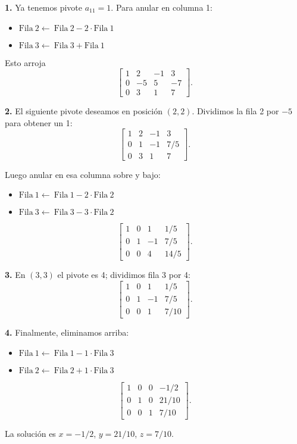 \noindent \textbf{1.} Ya tenemos pivote \(a_{11}=1\). Para anular en columna 1:
\begin{itemize}
  \item \(\text{Fila} ~ 2 \leftarrow ~ \text{Fila} ~ 2 - 2\cdot\text{Fila} ~ 1\)
  \item \(\text{Fila} ~ 3 \leftarrow ~ \text{Fila} ~ 3 + \text{Fila} ~ 1\)
\end{itemize}
Esto arroja
\[
\left[\begin{array}{ccc|c}
1 & 2 & -1 & 3\\
0 & -5 & 5 & -7\\
0 & 3 & 1 & 7
\end{array}\right].
\]

\noindent \textbf{2.} El siguiente pivote deseamos en posición \((2,2)\). Dividimos la fila 2 por \(-5\) para obtener un 1:
\[
\left[\begin{array}{ccc|c}
1 & 2 & -1 & 3\\
0 & 1 & -1 & 7/5\\
0 & 3 & 1 & 7
\end{array}\right].
\]

Luego anular en esa columna sobre y bajo:
\begin{itemize}
  \item \(\text{Fila} ~ 1 \leftarrow ~ \text{Fila} ~ 1 - 2\cdot\text{Fila} ~ 2\)
  \item \(\text{Fila} ~ 3 \leftarrow ~ \text{Fila} ~ 3 - 3\cdot\text{Fila} ~ 2\)
\end{itemize}

\[
\left[\begin{array}{ccc|c}
1 & 0 & 1 & 1/5\\
0 & 1 & -1 & 7/5\\
0 & 0 & 4 & 14/5
\end{array}\right].
\]

\noindent \textbf{3.} En \((3,3)\) el pivote es 4; dividimos fila 3 por 4:
\[
\left[\begin{array}{ccc|c}
1 & 0 & 1 & 1/5\\
0 & 1 & -1 & 7/5\\
0 & 0 & 1 & 7/10
\end{array}\right].
\]

\noindent \textbf{4.} Finalmente, eliminamos arriba:
\begin{itemize}
  \item \(\text{Fila} ~ 1 \leftarrow ~ \text{Fila} ~ 1 - 1\cdot\text{Fila} ~ 3\)
  \item \(\text{Fila} ~ 2 \leftarrow ~ \text{Fila} ~ 2 + 1\cdot\text{Fila} ~ 3\)
\end{itemize}

\[
\left[\begin{array}{ccc|c}
1 & 0 & 0 & -1/2\\
0 & 1 & 0 & 21/10\\
0 & 0 & 1 & 7/10
\end{array}\right].
\]

La solución es \(x=-1/2\), \(y=21/10\), \(z=7/10\).

